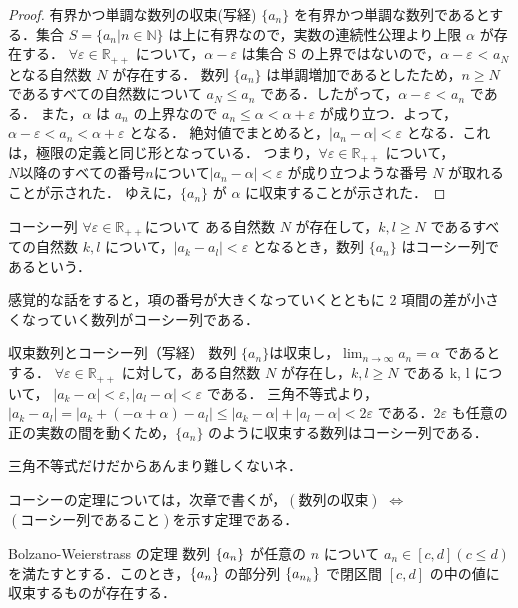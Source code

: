 \documentclass[a4paper]{ltjsarticle}
\begin{document}
  \begin{proof}{有界かつ単調な数列の収束(写経)}{}
   $\{a_n\}$ を有界かつ単調な数列であるとする．集合 $S = \{a_n | n \in \mathbb{N}\}$ は上に有界なので，実数の連続性公理より上限 $\alpha$ が存在する．
   $\forall \varepsilon \in \mathbb{R_{++}}$ について，$\alpha - \varepsilon$ は集合 S の上界ではないので，$\alpha - \varepsilon$ < $a_N$ となる自然数 $N$ が存在する．
   数列 $\{a_n\}$ は単調増加であるとしたため，$n \geq N$ であるすべての自然数について $a_N \leq a_n$ である．したがって，$\alpha - \varepsilon$ < $a_n$ である．
   また，$\alpha$ は $a_n$ の上界なので $a_n \leq \alpha < \alpha + \varepsilon$ が成り立つ．よって，$\alpha - \varepsilon < a_n < \alpha + \varepsilon$ となる．
   絶対値でまとめると，$|a_n - \alpha| < \varepsilon$ となる．これは，極限の定義と同じ形となっている．
   つまり，$\forall \varepsilon \in \mathbb{R_{++}}$ について，$N 以降のすべての番号 n について |a_n - \alpha| < \varepsilon$ が成り立つような番号 $N$ が取れることが示された．
   ゆえに，$\{a_n\}$ が $\alpha$ に収束することが示された．
  \end{proof}

  \begin{tcb}{コーシー列}{}
   $\forall \varepsilon \in \mathbb{R_{++}}$について ある自然数 $N$ が存在して，$k, l \geq N$ であるすべての自然数 $k, l$
   について，$|a_k - a_l| < \varepsilon$ となるとき，数列 $\{a_n\}$ はコーシー列であるという．
  \end{tcb}
 感覚的な話をすると，項の番号が大きくなっていくとともに 2 項間の差が小さくなっていく数列がコーシー列である．

  \begin{theorem}{収束数列とコーシー列（写経）}{}
   数列 $\{a_n\} は収束し，\lim_{n \rightarrow \infty} a_n = \alpha$ であるとする．
   $\forall\varepsilon \in \mathbb{R_{++}}$ に対して，ある自然数 $N$ が存在し，$k, l \geq N$ である \forall k, \forall l について，
   $|a_k - \alpha| < \varepsilon, |a_l - \alpha| < \varepsilon$ である．
   三角不等式より，$|a_k - a_l| = |a_k + (-\alpha + \alpha) - a_l| \leq |a_k - \alpha| + |a_l - \alpha| < 2 \varepsilon$
   である．$2\varepsilon$ も任意の正の実数の間を動くため，$\{a_n\}$ のように収束する数列はコーシー列である．
  \end{theorem}
 三角不等式だけだからあんまり難しくないネ．

 コーシーの定理については，次章で書くが，$(数列の収束)$ $\Leftrightarrow$ $(コーシー列であること)$を示す定理である．

  \begin{theorem}{Bolzano-Weierstrass の定理}{}
   数列 $\{a_n\}$ が任意の $n$ について $a_n \in [c, d] (c \leq d)$を満たすとする．このとき，$\{a_n\}$ の部分列 $\{a_{n_k}\}$ で閉区間 $[c, d]$ の中の値に収束するものが存在する．
  \end{theorem}
\end{document}
